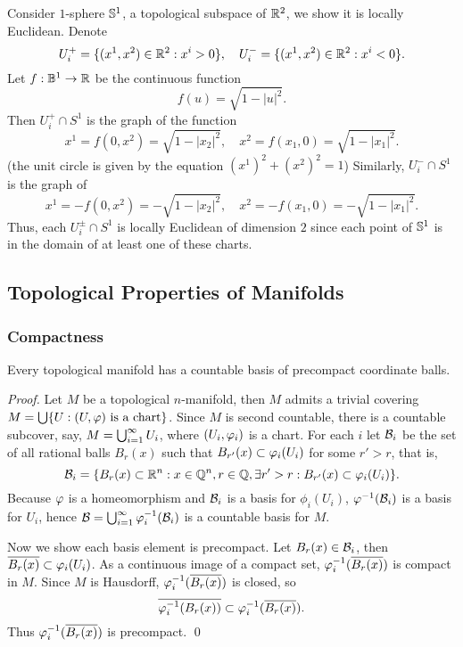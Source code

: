 \begin{example}\label{1-sphere}
    Consider $1$-sphere $\S^1$, a topological subspace of $\R^2$, we show it is locally Euclidean.  
    Denote 
    $$U_i^+ = \{(x^1, x^2) \in \R^2: x^i > 0\}, \quad 
      U_i^- = \{(x^1, x^2) \in \R^2: x^i < 0\}. $$
    Let $f: \B^1 \to \R$ be the continuous function
    $$f(u) = \sqrt{1-|u|^2}.$$
    Then $U_i^+ \cap S^1$ is the graph of the function
    $$x^1 = f(0, x^2) = \sqrt{1-|x_2|^2}, \quad 
      x^2 = f(x_1, 0) = \sqrt{1-|x_1|^2}. $$
    (the unit circle is given by the equation $(x^1)^2 + (x^2)^2 = 1$)
    Similarly, $U_i^- \cap S^1$ is the graph of 
    $$x^1 = -f(0, x^2) = -\sqrt{1-|x_2|^2}, \quad 
      x^2 = -f(x_1, 0) = -\sqrt{1-|x_1|^2}. $$
    Thus, each $U_i^{\pm} \cap S^1$ is locally Euclidean of dimension $2$ since each point of $\S^1$ is in the domain of at least one of these charts. 
\end{example}
\subsection{Topological Properties of Manifolds}
\subsubsection*{Compactness}

\begin{lemma}
    Every topological manifold has a countable basis of precompact coordinate balls. 
\end{lemma}
\begin{proof}
    Let $M$ be a topological $n$-manifold, then $M$ admits a trivial covering 
    $M = \bigcup \{U: (U,\phe) \text{ is a chart}\}$. Since $M$ is second countable, there is a countable subcover, say, $M = \bCup{i=1}{\infty}U_i$, where $(U_i,\phe_i)$ is a chart. 
    For each $i$ let $\calB_i$ be the set of all rational balls $B_r(x)$ such that $B_{r'}(x) \subset \phe_i(U_i)$ for some $r'>r$, that is, 
    $$\calB_i = \{B_r(x) \subset \R^n: x \in \Q^n, r \in \Q, \exists r'>r: B_{r'}(x) \subset \phe_i(U_i) \}. $$
    Because $\phe$ is a homeomorphism and $\calB_i$ is a basis for $\phi_i(U_i)$, 
    $\phe^{-1}(\calB_i)$ is a basis for $U_i$, hence $\calB = \bCup{i=1}{\infty}\phe_i^{-1}(\calB_i)$ is a countable basis for $M$. 

    Now we show each basis element is precompact. Let $B_r(x) \in \calB_i$, then $\cl{B_r(x)} \subset \phe_i(U_i)$. As a continuous image of a compact set, 
    $\phe_i^{-1}(\cl{B_r(x)})$ is compact in $M$. Since $M$ is Hausdorff, $\phe_i^{-1}(\cl{B_r(x)})$ is closed, so 
    $$\cl{\phe_i^{-1}(B_r(x))} \subset \phe_i^{-1}(\cl{B_r(x)}). $$
    Thus $\phe_i^{-1}(\cl{B_r(x)})$ is precompact. \qed 
\end{proof}


